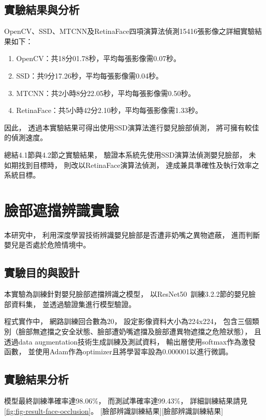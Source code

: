 \documentclass[class=NCU_thesis, crop=false]{standalone}
\begin{document}
\subsection{實驗結果與分析}
OpenCV、SSD、MTCNN及RetinaFace四項演算法偵測15416張影像之詳細實驗結果如下：
\begin{enumerate}
    \item OpenCV：共18分01.78秒，平均每張影像需0.07秒。
    \item SSD：共9分17.26秒，平均每張影像需0.04秒。
    \item MTCNN：共2小時8分22.05秒，平均每張影像需0.50秒。
    \item RetinaFace：共5小時42分2.10秒，平均每張影像需1.33秒。
\end{enumerate}

因此，
透過本實驗結果可得出使用SSD演算法進行嬰兒臉部偵測，
將可擁有較佳的偵測速度。

總結4.1節與4.2節之實驗結果，
驗證本系統先使用SSD演算法偵測嬰兒臉部，
未如期找到目標時，
則改以RetinaFace演算法偵測，
達成兼具準確性及執行效率之系統目標。

\section{臉部遮擋辨識實驗}
本研究中，
利用深度學習技術辨識嬰兒臉部是否遭非奶嘴之異物遮蔽，
進而判斷嬰兒是否處於危險情境中。

\subsection{實驗目的與設計}
本實驗為訓練針對嬰兒臉部遮擋辨識之模型，
以ResNet50~\cite{he_deep_2016}訓練3.2.2節的嬰兒臉部資料集，
並透過驗證集進行模型驗證。

程式實作中，
網路訓練回合數為20，
設定影像資料大小為224x224，
包含三個類別（臉部無遮擋之安全狀態、臉部遭奶嘴遮擋及臉部遭異物遮擋之危險狀態），
且透過data augmentation技術生成訓練及測試資料，
輸出層使用softmax作為激發函數，
並使用Adam作為optimizer且將學習率設為0.000001以進行微調。

\subsection{實驗結果分析}
模型最終訓練準確率達98.06\%，
而測試準確率達99.43\%，
詳細訓練結果請見\cref{fig:fig-result-face-occlusion}。
[臉部辨識訓練結果][臉部辨識訓練結果]
\end{document}
